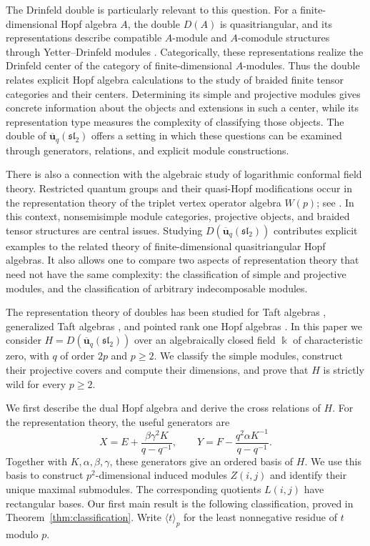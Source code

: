\documentclass[10pt,oneside]{amsart}
\newcommand{\uq}{\mathbf{\overline{u}}_q(\mathfrak{sl_2})}
\newcommand{\kk}{\Bbbk}
\newcommand{\res}[1]{\langle #1\rangle_p}
\theoremstyle{definition}
\begin{document}
The Drinfeld double is particularly relevant to this question. For a finite-dimensional Hopf algebra $A$, the double $D(A)$ is quasitriangular, and its representations describe compatible $A$-module and $A$-comodule structures through Yetter--Drinfeld modules \cite{Ka,Mo}. Categorically, these representations realize the Drinfeld center of the category of finite-dimensional $A$-modules. Thus the double relates explicit Hopf algebra calculations to the study of braided finite tensor categories and their centers. Determining its simple and projective modules gives concrete information about the objects and extensions in such a center, while its representation type measures the complexity of classifying those objects. The double of $\uq$ offers a setting in which these questions can be examined through generators, relations, and explicit module constructions.

There is also a connection with the algebraic study of logarithmic conformal field theory. Restricted quantum groups and their quasi-Hopf modifications occur in the representation theory of the triplet vertex operator algebra $W(p)$; see \cite{B.A,K.N.A,CGR}. In this context, nonsemisimple module categories, projective objects, and braided tensor structures are central issues. Studying $D(\uq)$ contributes explicit examples to the related theory of finite-dimensional quasitriangular Hopf algebras. It also allows one to compare two aspects of representation theory that need not have the same complexity: the classification of simple and projective modules, and the classification of arbitrary indecomposable modules.

The representation theory of doubles has been studied for Taft algebras \cite{H.C.X99,Ch2,Ch3,Ch4}, generalized Taft algebras \cite{EGST2006,EGST2019}, and pointed rank one Hopf algebras \cite{S.C.Z,S.C.z}. In this paper we consider $H=D(\uq)$ over an algebraically closed field $\kk$ of characteristic zero, with $q$ of order $2p$ and $p\ge2$. We classify the simple modules, construct their projective covers and compute their dimensions, and prove that $H$ is strictly wild for every $p\ge2$.

We first describe the dual Hopf algebra and derive the cross relations of $H$. For the representation theory, the useful generators are
\[
 X=E+\frac{\beta\gamma^2K}{q-q^{-1}},\qquad
 Y=F-\frac{q^2\alpha K^{-1}}{q-q^{-1}}.
\]
Together with $K,\alpha,\beta,\gamma$, these generators give an ordered basis of $H$. We use this basis to construct $p^2$-dimensional induced modules $Z(i,j)$ and identify their unique maximal submodules. The corresponding quotients $L(i,j)$ have rectangular bases. Our first main result is the following classification, proved in Theorem~\ref{thm:classification}. Write $\res t$ for the least nonnegative residue of $t$ modulo $p$.
\end{document}
